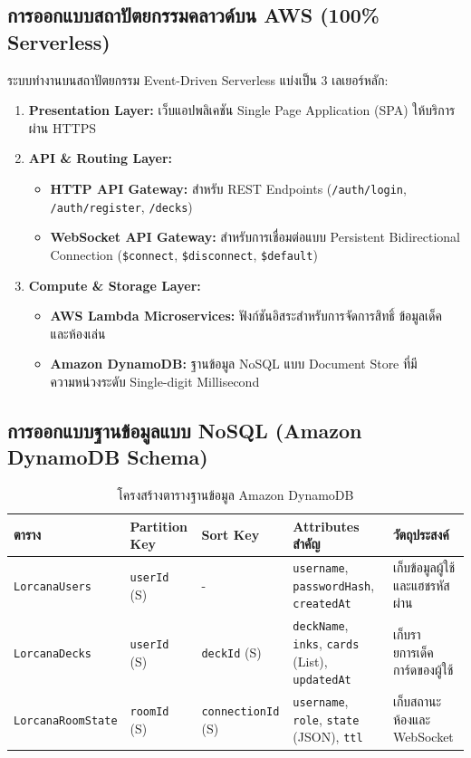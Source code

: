 \documentclass[12pt,a4paper]{article}
\begin{document}
\subsection{การออกแบบสถาปัตยกรรมคลาวด์บน AWS (100\% Serverless)}
ระบบทำงานบนสถาปัตยกรรม Event-Driven Serverless แบ่งเป็น 3 เลเยอร์หลัก:
\begin{enumerate}[leftmargin=1.5em, itemsep=2pt]
  \item \textbf{Presentation Layer:} เว็บแอปพลิเคชัน Single Page Application (SPA) ให้บริการผ่าน HTTPS
  \item \textbf{API \& Routing Layer:} 
  \begin{itemize}[leftmargin=1.5em, itemsep=1pt]
    \item \textbf{HTTP API Gateway:} สำหรับ REST Endpoints (\texttt{/auth/login}, \texttt{/auth/register}, \texttt{/decks})
    \item \textbf{WebSocket API Gateway:} สำหรับการเชื่อมต่อแบบ Persistent Bidirectional Connection (\texttt{\$connect}, \texttt{\$disconnect}, \texttt{\$default})
  \end{itemize}
  \item \textbf{Compute \& Storage Layer:}
  \begin{itemize}[leftmargin=1.5em, itemsep=1pt]
    \item \textbf{AWS Lambda Microservices:} ฟังก์ชันอิสระสำหรับการจัดการสิทธิ์ ข้อมูลเด็ค และห้องเล่น
    \item \textbf{Amazon DynamoDB:} ฐานข้อมูล NoSQL แบบ Document Store ที่มีความหน่วงระดับ Single-digit Millisecond
  \end{itemize}
\end{enumerate}

\subsection{การออกแบบฐานข้อมูลแบบ NoSQL (Amazon DynamoDB Schema)}

\begin{table}[H]
\centering
\small
\begin{tabular}{p{3cm} p{2.2cm} p{2.2cm} p{3.8cm} p{3.2cm}}
\toprule
\textbf{ตาราง} & \textbf{Partition Key} & \textbf{Sort Key} & \textbf{Attributes สำคัญ} & \textbf{วัตถุประสงค์} \\
\midrule
\texttt{LorcanaUsers} & \texttt{userId} (S) & - & \texttt{username}, \texttt{passwordHash}, \texttt{createdAt} & เก็บข้อมูลผู้ใช้และแฮชรหัสผ่าน \\
\texttt{LorcanaDecks} & \texttt{userId} (S) & \texttt{deckId} (S) & \texttt{deckName}, \texttt{inks}, \texttt{cards} (List), \texttt{updatedAt} & เก็บรายการเด็คการ์ดของผู้ใช้ \\
\texttt{LorcanaRoomState} & \texttt{roomId} (S) & \texttt{connectionId} (S) & \texttt{username}, \texttt{role}, \texttt{state} (JSON), \texttt{ttl} & เก็บสถานะห้องและ WebSocket \\
\bottomrule
\end{tabular}
\caption{โครงสร้างตารางฐานข้อมูล Amazon DynamoDB}
\end{table}
\end{document}
